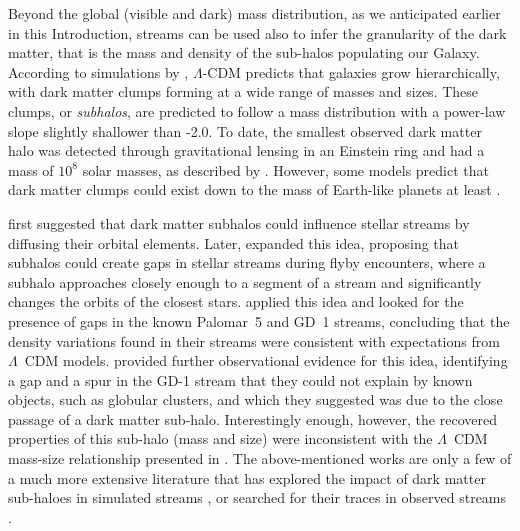 \documentclass{aa}
\begin{document}
  
  Beyond the global (visible and dark) mass distribution, as we anticipated earlier in this Introduction, streams can be used also to infer the granularity of the dark matter, that is the mass and density of the sub-halos populating our Galaxy. According to simulations by \citet{2008MNRAS.391.1685S}, $\Lambda$-CDM predicts that galaxies grow hierarchically, with dark matter clumps forming at a wide range of masses and sizes. These clumps, or \textit{subhalos}, are predicted to follow a mass distribution with a power-law slope slightly shallower than -2.0. To date, the smallest observed dark matter halo was detected through gravitational lensing in an Einstein ring and had a mass of $10^8$ solar masses, as described by \citet{2012Natur.481..341V}. However, some models predict that dark matter clumps could exist down to the mass of Earth-like planets at least \citep[see][ and discussion in \citet{2021arXiv211101148A} ]{2005JCAP...08..003G, wang20}. 

  \citet{2002MNRAS.332..915I} first suggested that dark matter subhalos could influence stellar streams by diffusing their orbital elements. Later, \citet{2012ApJ...748...20C} expanded this idea, proposing that subhalos could create gaps in stellar streams during flyby encounters, where a subhalo approaches closely enough to a segment of a stream and significantly changes the orbits of the closest stars.  \citet{2012ApJ...760...75C, 2013ApJ...768..171C} applied this idea and looked for the presence of gaps in the known Palomar~5 and GD~1 streams, concluding that the density variations found in their streams were consistent with expectations from $\Lambda$~CDM models.  \citet{2019ApJ...880...38B} provided further observational evidence for this idea, identifying a gap and a spur in the GD-1 stream that they could not explain by known objects, such as globular clusters, and which they suggested was due to the close passage of a dark matter sub-halo. Interestingly enough, however, the recovered properties of this sub-halo (mass and size) were inconsistent with the $\Lambda$~CDM mass-size relationship presented in \cite{2017MNRAS.466.4974M}. The above-mentioned works are only a few of a much more extensive literature that has explored the impact of dark matter sub-haloes in simulated streams \citep{2016ApJ...828L..10H, 2021MNRAS.507.1999H, 2021JCAP...10..043B, 2024arXiv240402953H, 2024arXiv241021174N}, or searched for their traces in observed streams \citep{2016MNRAS.460.2711T, 2017MNRAS.470...60E, 2020ApJ...889...70B, 2020ApJ...892L..37B}.
\end{document}
